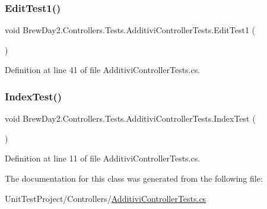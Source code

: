 \subsubsection{\texorpdfstring{Edit\+Test1()}{EditTest1()}}
{\footnotesize\ttfamily void Brew\+Day2.\+Controllers.\+Tests.\+Additivi\+Controller\+Tests.\+Edit\+Test1 (\begin{DoxyParamCaption}{ }\end{DoxyParamCaption})}



Definition at line 41 of file Additivi\+Controller\+Tests.\+cs.

\mbox{\label{class_brew_day2_1_1_controllers_1_1_tests_1_1_additivi_controller_tests_adf5570aa3473a6971ec22245071b8964}} 
\subsubsection{\texorpdfstring{Index\+Test()}{IndexTest()}}
{\footnotesize\ttfamily void Brew\+Day2.\+Controllers.\+Tests.\+Additivi\+Controller\+Tests.\+Index\+Test (\begin{DoxyParamCaption}{ }\end{DoxyParamCaption})}



Definition at line 11 of file Additivi\+Controller\+Tests.\+cs.



The documentation for this class was generated from the following file\+:\begin{DoxyCompactItemize}
\item 
Unit\+Test\+Project/\+Controllers/\mbox{\hyperlink{_additivi_controller_tests_8cs}{Additivi\+Controller\+Tests.\+cs}}\end{DoxyCompactItemize}
